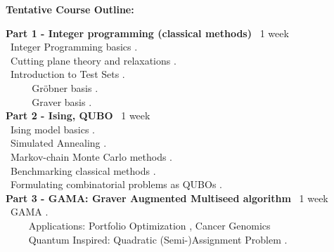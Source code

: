 \documentclass[11pt, a4paper]{article}
\begin{document}

\noindent \textbf{Tentative Course Outline:}
\begin{center} 
\begin{minipage}{5in}
\begin{flushleft}
{\bf Part 1 - Integer programming (classical methods)} \dotfill ~1 week \\
{\color{darkred}{\Rectangle}} ~Integer Programming basics \cite{conforti2014integer}. \\
{\color{darkred}{\Rectangle}} ~Cutting plane theory and relaxations \cite{conforti2014integer}. \\
{\color{darkred}{\Rectangle}} ~Introduction to Test Sets  \cite{sturmfels1996grobner,tayur1995algebraic}. \\
~~~{\color{darkred}{\Rectangle}} ~ Gr{\"o}bner basis \cite{bertsimas2000new,hocsten1995grin}. \\
~~~{\color{darkred}{\Rectangle}} ~ Graver basis \cite{hemmecke2011polynomial}. \\

{\bf Part 2 - Ising, QUBO} \dotfill ~1 week \\
{\color{darkred}{\Rectangle}} ~Ising model basics \cite{brush1967history,sherrington1975solvable,ray1989sherrington}. \\
{\color{darkred}{\Rectangle}} ~Simulated Annealing \cite{kirkpatrick1983optimization,koulamas1994survey}. \\
{\color{darkred}{\Rectangle}} ~Markov-chain Monte Carlo methods \cite{metropolis1953equation,bortz1975new,troyer2005computational,young2008size}. \\
{\color{darkred}{\Rectangle}} ~Benchmarking classical methods \cite{dunning2018works,coffrin2019evaluating}. \\
{\color{darkred}{\Rectangle}} ~Formulating combinatorial problems as QUBOs \cite{lucas2014ising}. \\


{\bf Part 3 - GAMA: Graver Augmented Multiseed algorithm} \dotfill ~1 week \\
{\color{darkred}{\Rectangle}} ~GAMA \cite{alghassi2019graver}. \\
~~~{\color{darkred}{\Rectangle}} ~Applications: Portfolio Optimization \cite{alghassi2019graver}, Cancer Genomics \cite{alghassi2019quantum} \\
~~~{\color{darkred}{\Rectangle}} ~Quantum Inspired: Quadratic (Semi-)Assignment Problem \cite{alghassi2019gama}.


\end{flushleft}
\end{minipage}
\end{center}
\end{document}
